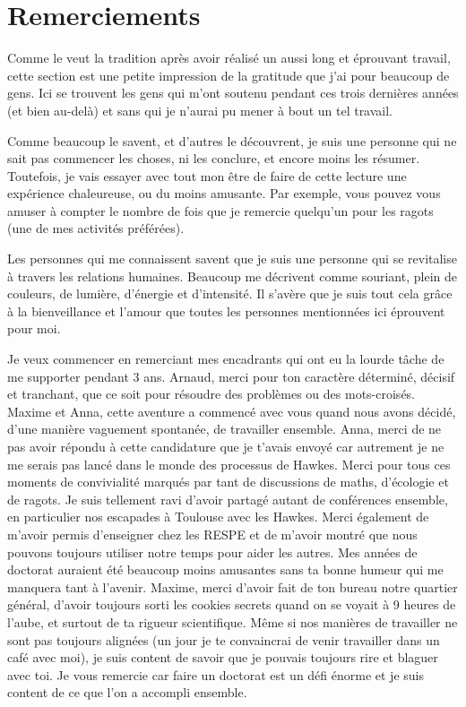\chapter{Remerciements}

Comme le veut la tradition après avoir réalisé un aussi long et éprouvant travail, cette section est une petite impression de la gratitude que j’ai pour beaucoup de gens.
Ici se trouvent les gens qui m’ont soutenu pendant ces trois dernières années (et bien au-delà) et sans qui je n’aurai pu mener à bout un tel travail.

Comme beaucoup le savent, et d’autres le découvrent, je suis une personne qui ne sait pas commencer les choses, ni les conclure, et encore moins les résumer. Toutefois, je vais essayer avec tout mon être de faire de cette lecture une expérience chaleureuse, ou du moins amusante. Par exemple, vous pouvez vous amuser à compter le nombre de fois que je remercie quelqu'un pour les ragots (une de mes activités préférées). 

Les personnes qui me connaissent savent que je suis une personne qui se revitalise à travers les relations humaines. Beaucoup me décrivent comme souriant, plein de couleurs, de lumière, d’énergie et d’intensité. Il s’avère que je suis tout cela grâce à la bienveillance et l’amour que toutes les personnes mentionnées ici éprouvent pour moi.
\vspace{5mm}

Je veux commencer en remerciant mes encadrants qui ont eu la lourde tâche de me supporter pendant 3 ans. Arnaud, merci pour ton caractère déterminé, décisif et tranchant, que ce soit pour résoudre des problèmes ou des mots-croisés. Maxime et Anna, cette aventure a commencé avec vous quand nous avons décidé, d’une manière vaguement spontanée, de travailler ensemble. Anna, merci de ne pas avoir répondu à cette candidature que je t’avais envoyé car autrement je ne me serais pas lancé dans le monde des processus de Hawkes. Merci pour tous ces moments de convivialité marqués par tant de discussions de maths, d’écologie et de ragots. Je suis tellement ravi d’avoir partagé autant de conférences ensemble, en particulier nos escapades à Toulouse avec les Hawkes. Merci également de m’avoir permis d’enseigner chez les RESPE et de m’avoir montré que nous pouvons toujours utiliser notre temps pour aider les autres. Mes années de doctorat auraient été beaucoup moins amusantes sans ta bonne humeur qui me manquera tant à l’avenir. Maxime, merci d’avoir fait de ton bureau notre quartier général, d’avoir toujours sorti les cookies secrets quand on se voyait à 9 heures de l’aube, et surtout de ta rigueur scientifique. Même si nos manières de travailler ne sont pas toujours alignées (un jour je te convaincrai de venir travailler dans un café avec moi), je suis content de savoir que je pouvais toujours rire et blaguer avec toi. Je vous remercie car faire un doctorat est un défi énorme et je suis content de ce que l’on a accompli ensemble.

